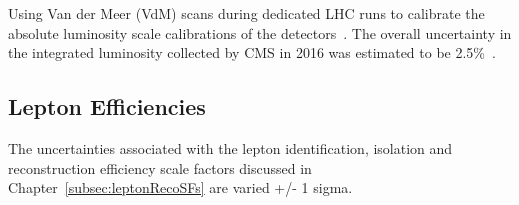Using Van der Meer (VdM) scans during dedicated LHC runs to calibrate the absolute luminosity scale calibrations of the detectors~\cite{vanderMeer:1968zz}.
The overall uncertainty in the integrated luminosity collected by CMS in 2016 was estimated to be 2.5\%~\cite{CMS:2017_lumi}.


\subsection{Lepton Efficiencies}
The uncertainties associated with the lepton identification, isolation and reconstruction efficiency scale factors discussed in Chapter~\ref{subsec:leptonRecoSFs} are varied +/- 1 sigma.


%
%

